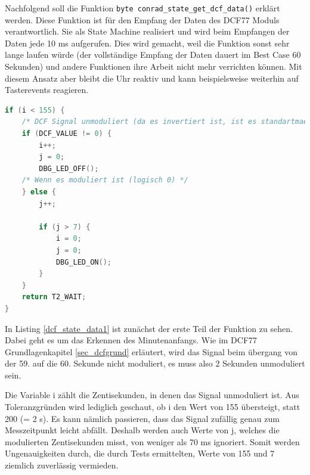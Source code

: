 Nachfolgend soll die Funktion \texttt{byte conrad\_state\_get\_dcf\_data()} erklärt werden. Diese Funktion ist für den Empfang der Daten des DCF77 Moduls verantwortlich. Sie als State Machine realisiert und wird beim Empfangen der Daten jede 10 ms aufgerufen. Dies wird gemacht, weil die Funktion sonst sehr lange laufen würde (der vollständige Empfang der Daten dauert im Best Case 60 Sekunden) und andere Funktionen ihre Arbeit nicht mehr verrichten können. Mit diesem Ansatz aber bleibt die Uhr reaktiv und kann beispielsweise weiterhin auf Tasterevents reagieren.
%
\begin{lstlisting}[language=C,label=dcf_state_data1,caption=Empfang des DCF77 Signals - Minutenstart erkennen]
if (i < 155) {
    /* DCF Signal unmoduliert (da es invertiert ist, ist es standartmaessig 1) */
    if (DCF_VALUE != 0) {
        i++;
        j = 0;
        DBG_LED_OFF();
    /* Wenn es moduliert ist (logisch 0) */
    } else {
        j++;

        if (j > 7) {
            i = 0;
            j = 0;
            DBG_LED_ON();
        }
    }
    return T2_WAIT;
}
\end{lstlisting}
%
In Listing \ref{dcf_state_data1} ist zunächst der erste Teil der Funktion zu sehen. Dabei geht es um das Erkennen des Minutenanfangs. Wie im DCF77 Grundlagenkapitel \ref{sec_dcfgrund} erläutert, wird das Signal beim übergang von der 59. auf die 60. Sekunde nicht moduliert, es muss also 2 Sekunden unmoduliert sein.

Die Variable i zählt die Zentisekunden, in denen das Signal unmoduliert ist. Aus Toleranzgründen wird lediglich geschaut, ob i den Wert von 155 übersteigt, statt 200 (= 2 s). Es kann nämlich passieren, dass das Signal zufällig genau zum Messzeitpunkt leicht abfällt. Deshalb werden auch Werte von j, welches die modulierten Zentisekunden misst, von weniger als 70 ms ignoriert. Somit werden Ungenauigkeiten durch, die durch Tests ermittelten, Werte von 155 und 7 ziemlich zuverlässig vermieden.

